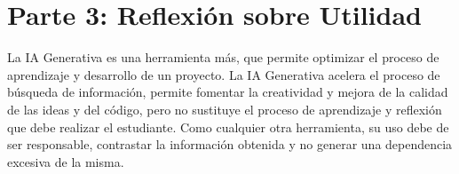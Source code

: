\section*{Parte 3: Reflexión sobre Utilidad}
La IA Generativa es una herramienta más, que permite optimizar el proceso de aprendizaje y desarrollo de un proyecto. La IA Generativa acelera el proceso de búsqueda de información, permite fomentar la creatividad y mejora de la calidad de las ideas y del código, pero no sustituye el proceso de aprendizaje y reflexión que debe realizar el estudiante. Como cualquier otra herramienta, su uso debe de ser responsable, contrastar la información obtenida y no generar una dependencia excesiva de la misma.
